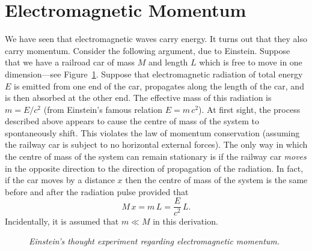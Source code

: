 \section{Electromagnetic Momentum}
We have seen that electromagnetic waves carry energy.
 It turns out that they also carry momentum. Consider the following argument, due
to Einstein. Suppose that we have a railroad car of mass $M$ and length
$L$ which is free
to move in one dimension---see Figure~\ref{f47}. Suppose that electromagnetic radiation of total
energy $E$ is emitted from one end of the car, propagates along the length of
the car, and is then absorbed at the other end. The effective mass of this radiation
is $m= E/c^2$ (from Einstein's famous relation $E=m\, c^2$). At first sight,
the process described above appears to cause the centre of mass of the system 
to spontaneously shift. This violates the law of momentum conservation (assuming the
railway car is subject to no horizontal external forces). The only way in which the
centre of mass of the system can remain stationary is if the railway car
{\em moves} in the opposite direction to the direction of propagation of
the radiation. In fact, if the car moves by a distance $x$ then the centre of
mass of the system is the same before and after the radiation pulse provided that
\begin{equation}
M\, x  = m \,L = \frac{E}{c^2}\, L.
\end{equation}
Incidentally, it is assumed that $m\ll M$ in this derivation.
\begin{figure}
\centerline{}
\caption{\em Einstein's thought experiment regarding electromagnetic momentum.}\label{f47}
\end{figure}


